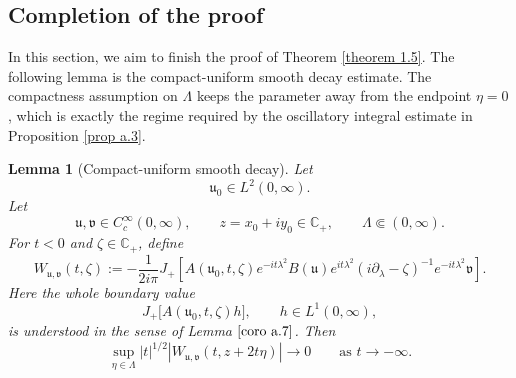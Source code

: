\documentclass[10pt]{article}
\newtheorem{lemma}[theorem]{Lemma}
\numberwithin{equation}{section}
\numberwithin{theorem}{section}
\begin{document}
\subsection{Completion of the proof}
In this section, we aim to finish the proof of Theorem \ref{theorem 1.5}. The following lemma is the compact-uniform smooth decay estimate. The compactness assumption on
\(\Lambda\) keeps the parameter away from the endpoint \(\eta=0\), which is
exactly the regime required by the oscillatory integral estimate in Proposition
\ref{prop a.3}.
\begin{lemma}[Compact-uniform smooth decay]
\label{lemma:smooth_compact_uniform_decay}
Let
\[
\mathfrak u_0\in L^2(0,\infty).
\]
Let
\[
\mathfrak u,\mathfrak v\in C_c^\infty(0,\infty),
\qquad
z=x_0+iy_0\in\mathbb C_+,
\qquad
\Lambda\Subset(0,\infty).
\]
For \(t<0\) and \(\zeta\in\mathbb C_+\), define
\begin{equation}
\label{eq:smooth-compact-W-def}
W_{\mathfrak u,\mathfrak v}(t,\zeta)
:=
-\frac1{2i\pi}
J_+\left[
A(\mathfrak u_0,t,\zeta)e^{-it\lambda^2}
B(\mathfrak u)e^{it\lambda^2}
(i\partial_\lambda-\zeta)^{-1}
e^{-it\lambda^2}\mathfrak v
\right].
\end{equation}
Here the whole boundary value
\[
J_+\bigl[A(\mathfrak u_0,t,\zeta)h\bigr],
\qquad h\in L^1(0,\infty),
\]
is understood in the sense of Lemma \(\ref{coro a.7}\). Then
\begin{equation}
\label{eq:smooth-compact-uniform-decay}
\sup_{\eta\in\Lambda}
|t|^{1/2}
\left|
W_{\mathfrak u,\mathfrak v}(t,z+2t\eta)
\right|
\longrightarrow0
\qquad\text{as }t\to-\infty.
\end{equation}
\end{lemma}
\end{document}
